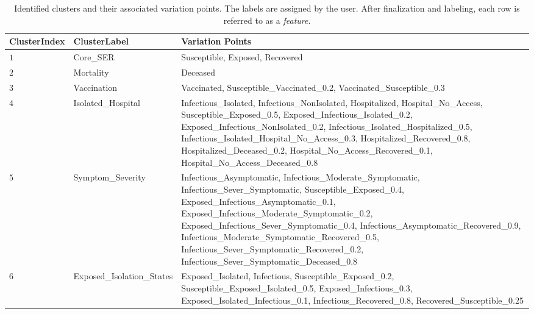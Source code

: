 \begin{table}[ht]
\centering
\begin{tabularx}{\textwidth}{|l|l|Y|}
\hline
\textbf{ClusterIndex} & \textbf{ClusterLabel} & \textbf{Variation Points} \\ \hline
$1$ & Core\_SER & Susceptible, Exposed, Recovered \\ \hline
$2$ & Mortality & Deceased\\ \hline
$3$ & Vaccination & Vaccinated, Susceptible\_Vaccinated\_0.2, Vaccinated\_Susceptible\_0.3 \\ \hline
$4$ & Isolated\_Hospital & Infectious\_Isolated, Infectious\_NonIsolated, Hospitalized, Hospital\_No\_Access, Susceptible\_Exposed\_0.5, Exposed\_Infectious\_Isolated\_0.2, Exposed\_Infectious\_NonIsolated\_0.2, Infectious\_Isolated\_Hospitalized\_0.5, Infectious\_Isolated\_Hospital\_No\_Access\_0.3, Hospitalized\_Recovered\_0.8, Hospitalized\_Deceased\_0.2, Hospital\_No\_Access\_Recovered\_0.1, Hospital\_No\_Access\_Deceased\_0.8
\\ \hline
$5$ & Symptom\_Severity & Infectious\_Asymptomatic, Infectious\_Moderate\_Symptomatic, Infectious\_Sever\_Symptomatic, Susceptible\_Exposed\_0.4, Exposed\_Infectious\_Asymptomatic\_0.1, Exposed\_Infectious\_Moderate\_Symptomatic\_0.2, Exposed\_Infectious\_Sever\_Symptomatic\_0.4, Infectious\_Asymptomatic\_Recovered\_0.9, Infectious\_Moderate\_Symptomatic\_Recovered\_0.5, Infectious\_Sever\_Symptomatic\_Recovered\_0.2, Infectious\_Sever\_Symptomatic\_Deceased\_0.8\\ \hline
$6$ & Exposed\_Isolation\_States & Exposed\_Isolated, Infectious, Susceptible\_Exposed\_0.2, Susceptible\_Exposed\_Isolated\_0.5, Exposed\_Infectious\_0.3, Exposed\_Isolated\_Infectious\_0.1, Infectious\_Recovered\_0.8, Recovered\_Susceptible\_0.25\\ \hline

\end{tabularx}
\caption{Identified clusters and their associated variation points. The labels are assigned by the user. After finalization and labeling, each row is referred to as a \textit{feature}.}
\label{tab:prototype_clusters}
\end{table}